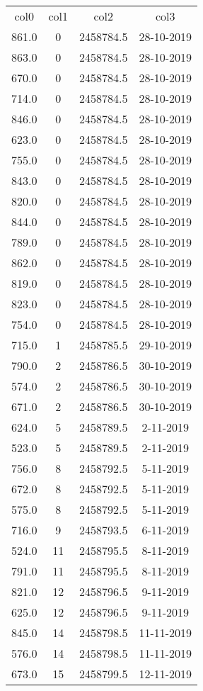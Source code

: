 \begin{table}
\begin{tabular}{cccc}
col0 & col1 & col2 & col3 \\
861.0 & 0 & 2458784.5 & 28-10-2019 \\
863.0 & 0 & 2458784.5 & 28-10-2019 \\
670.0 & 0 & 2458784.5 & 28-10-2019 \\
714.0 & 0 & 2458784.5 & 28-10-2019 \\
846.0 & 0 & 2458784.5 & 28-10-2019 \\
623.0 & 0 & 2458784.5 & 28-10-2019 \\
755.0 & 0 & 2458784.5 & 28-10-2019 \\
843.0 & 0 & 2458784.5 & 28-10-2019 \\
820.0 & 0 & 2458784.5 & 28-10-2019 \\
844.0 & 0 & 2458784.5 & 28-10-2019 \\
789.0 & 0 & 2458784.5 & 28-10-2019 \\
862.0 & 0 & 2458784.5 & 28-10-2019 \\
819.0 & 0 & 2458784.5 & 28-10-2019 \\
823.0 & 0 & 2458784.5 & 28-10-2019 \\
754.0 & 0 & 2458784.5 & 28-10-2019 \\
715.0 & 1 & 2458785.5 & 29-10-2019 \\
790.0 & 2 & 2458786.5 & 30-10-2019 \\
574.0 & 2 & 2458786.5 & 30-10-2019 \\
671.0 & 2 & 2458786.5 & 30-10-2019 \\
624.0 & 5 & 2458789.5 & 2-11-2019 \\
523.0 & 5 & 2458789.5 & 2-11-2019 \\
756.0 & 8 & 2458792.5 & 5-11-2019 \\
672.0 & 8 & 2458792.5 & 5-11-2019 \\
575.0 & 8 & 2458792.5 & 5-11-2019 \\
716.0 & 9 & 2458793.5 & 6-11-2019 \\
524.0 & 11 & 2458795.5 & 8-11-2019 \\
791.0 & 11 & 2458795.5 & 8-11-2019 \\
821.0 & 12 & 2458796.5 & 9-11-2019 \\
625.0 & 12 & 2458796.5 & 9-11-2019 \\
845.0 & 14 & 2458798.5 & 11-11-2019 \\
576.0 & 14 & 2458798.5 & 11-11-2019 \\
673.0 & 15 & 2458799.5 & 12-11-2019 \\

\end{tabular}
\end{table}
